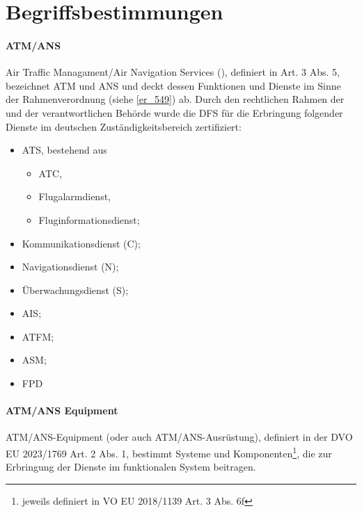 
\chapter{Begriffsbestimmungen}

\subsubsection{ATM/ANS}\label{beg:atmans}

Air Traffic Managament/Air Navigation Services (\atmans), definiert in  Art. 3 Abs. 5, bezeichnet \acf{ATM} und \acf{ANS} und deckt dessen Funktionen und Dienste im Sinne der Rahmenverordnung (siehe \ref{er_549}) ab.
Durch den rechtlichen Rahmen der  und der verantwortlichen Behörde wurde die DFS für die Erbringung folgender \atmans{} Dienste im deutschen Zuständigkeitsbereich zertifiziert: \cite[17]{ba_technik}
\begin{itemize}
    \item \acf{ATS}, bestehend aus
    \begin{itemize}
        \item \acf{ATC},
        \item Flugalarmdienst,
        \item Fluginformationsdienst;
    \end{itemize}
    \item  Kommunikationsdienst (C);
    \item  Navigationsdienst (N);
    \item  Überwachungsdienst (S);
    \item  \acf{AIS};
    \item  \acf{ATFM};
    \item  \acf{ASM};
    \item  \acf{FPD}
\end{itemize}

\subsubsection{ATM/ANS Equipment}

ATM/ANS-Equipment (oder auch ATM/ANS-Ausrüstung), definiert in der \acf{DVO} \acs{EU} 2023/1769 Art. 2 Abs. 1, bestimmt Systeme und Komponenten\footnote{jeweils definiert in VO EU 2018/1139 Art. 3 Abs. 6f}, die zur Erbringung der Dienste im funktionalen System beitragen.



